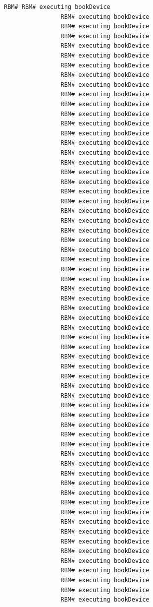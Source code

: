 \documentclass{article}
\begin{document}
\begin{Verbatim}[gobble=8]
                RBM# RBM# executing bookDevice
                RBM# executing bookDevice
                RBM# executing bookDevice
                RBM# executing bookDevice
                RBM# executing bookDevice
                RBM# executing bookDevice
                RBM# executing bookDevice
                RBM# executing bookDevice
                RBM# executing bookDevice
                RBM# executing bookDevice
                RBM# executing bookDevice
                RBM# executing bookDevice
                RBM# executing bookDevice
                RBM# executing bookDevice
                RBM# executing bookDevice
                RBM# executing bookDevice
                RBM# executing bookDevice
                RBM# executing bookDevice
                RBM# executing bookDevice
                RBM# executing bookDevice
                RBM# executing bookDevice
                RBM# executing bookDevice
                RBM# executing bookDevice
                RBM# executing bookDevice
                RBM# executing bookDevice
                RBM# executing bookDevice
                RBM# executing bookDevice
                RBM# executing bookDevice
                RBM# executing bookDevice
                RBM# executing bookDevice
                RBM# executing bookDevice
                RBM# executing bookDevice
                RBM# executing bookDevice
                RBM# executing bookDevice
                RBM# executing bookDevice
                RBM# executing bookDevice
                RBM# executing bookDevice
                RBM# executing bookDevice
                RBM# executing bookDevice
                RBM# executing bookDevice
                RBM# executing bookDevice
                RBM# executing bookDevice
                RBM# executing bookDevice
                RBM# executing bookDevice
                RBM# executing bookDevice
                RBM# executing bookDevice
                RBM# executing bookDevice
                RBM# executing bookDevice
                RBM# executing bookDevice
                RBM# executing bookDevice
                RBM# executing bookDevice
                RBM# executing bookDevice
                RBM# executing bookDevice
                RBM# executing bookDevice
                RBM# executing bookDevice
                RBM# executing bookDevice
                RBM# executing bookDevice
                RBM# executing bookDevice
                RBM# executing bookDevice
                RBM# executing bookDevice
                RBM# executing bookDevice
                RBM# executing bookDevice

\end{Verbatim}
\end{document}
